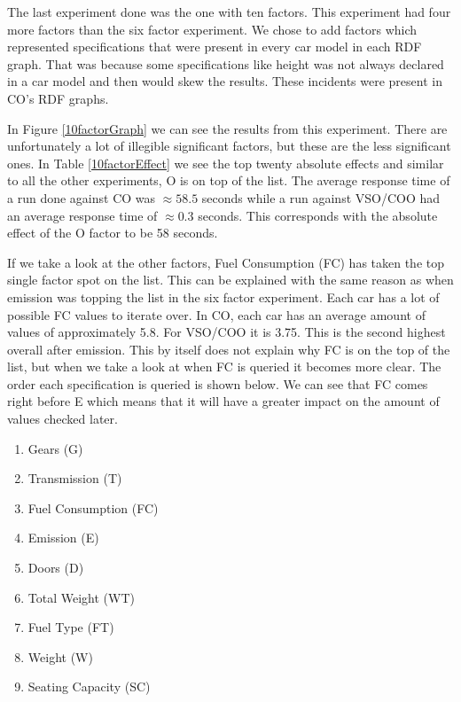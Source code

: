 \documentclass{llncs}
\begin{document}
The last experiment done was the one with ten factors. This experiment
had four more factors than the six factor experiment.  We chose to add
factors which represented specifications that were present in every
car model in each RDF graph. That was because some specifications like
height was not always declared in a car model and then would skew the
results. These incidents were present in CO's RDF graphs.

In Figure \vref{10factorGraph} we can see the results from this
experiment. There are unfortunately a lot of illegible significant
factors, but these are the less significant ones. In Table
\vref{10factorEffect} we see the top twenty absolute effects and
similar to all the other experiments, O is on top of the list. The
average response time of a run done against CO was $\approx58.5$
seconds while a run against VSO/COO had an average response time of
$\approx0.3$ seconds.  This corresponds with the absolute effect of
the O factor to be 58 seconds.
 
If we take a look at the other factors, Fuel Consumption (FC) has
taken the top single factor spot on the list.  This can be explained
with the same reason as when emission was topping the list in the six
factor experiment. Each car has a lot of possible FC values to iterate
over. In CO, each car has an average amount of values of approximately
5.8. For VSO/COO it is 3.75.  This is the second highest overall after
emission. This by itself does not explain why FC is on the top of the
list, but when we take a look at when FC is queried it becomes more
clear. The order each specification is queried is shown below.  We can
see that FC comes right before E which means that it will have a
greater impact on the amount of values checked later.

 \begin{enumerate}
  
		\item Gears (G)
		\item Transmission (T)
		\item Fuel Consumption (FC)
		\item Emission (E)
		\item Doors (D)
		\item Total Weight (WT)
		\item Fuel Type (FT)
		\item Weight (W)
		\item Seating Capacity (SC)
\end{enumerate}
\end{document}
